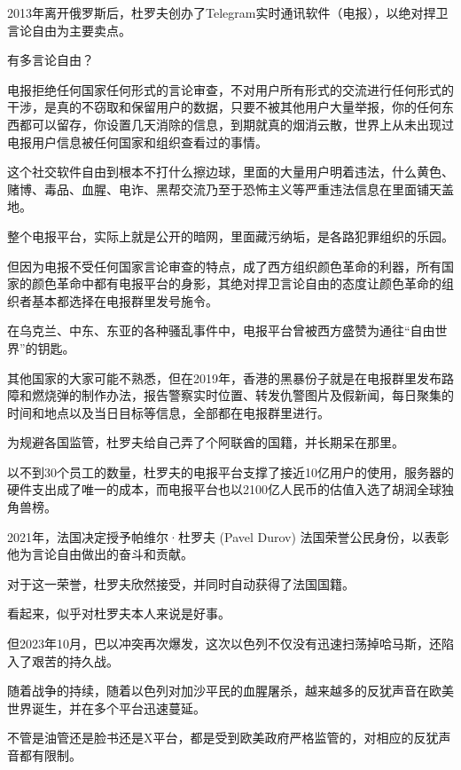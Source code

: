 \documentclass[UTF8,11pt,oneside]{ctexart}
\begin{document}

2013年离开俄罗斯后，杜罗夫创办了Telegram实时通讯软件（电报），以绝对捍卫言论自由为主要卖点。

有多言论自由？

电报拒绝任何国家任何形式的言论审查，不对用户所有形式的交流进行任何形式的干涉，是真的不窃取和保留用户的数据，只要不被其他用户大量举报，你的任何东西都可以留存，你设置几天消除的信息，到期就真的烟消云散，世界上从未出现过电报用户信息被任何国家和组织查看过的事情。

这个社交软件自由到根本不打什么擦边球，里面的大量用户明着违法，什么黄色、赌博、毒品、血腥、电诈、黑帮交流乃至于恐怖主义等严重违法信息在里面铺天盖地。


整个电报平台，实际上就是公开的暗网，里面藏污纳垢，是各路犯罪组织的乐园。

但因为电报不受任何国家言论审查的特点，成了西方组织颜色革命的利器，所有国家的颜色革命中都有电报平台的身影，其绝对捍卫言论自由的态度让颜色革命的组织者基本都选择在电报群里发号施令。

在乌克兰、中东、东亚的各种骚乱事件中，电报平台曾被西方盛赞为通往“自由世界”的钥匙。

其他国家的大家可能不熟悉，但在2019年，香港的黑暴份子就是在电报群里发布路障和燃烧弹的制作办法，报告警察实时位置、转发仇警图片及假新闻，每日聚集的时间和地点以及当日目标等信息，全部都在电报群里进行。

为规避各国监管，杜罗夫给自己弄了个阿联酋的国籍，并长期呆在那里。

以不到30个员工的数量，杜罗夫的电报平台支撑了接近10亿用户的使用，服务器的硬件支出成了唯一的成本，而电报平台也以2100亿人民币的估值入选了胡润全球独角兽榜。

2021年，法国决定授予帕维尔·杜罗夫 (Pavel Durov) 法国荣誉公民身份，以表彰他为言论自由做出的奋斗和贡献。

对于这一荣誉，杜罗夫欣然接受，并同时自动获得了法国国籍。

看起来，似乎对杜罗夫本人来说是好事。

但2023年10月，巴以冲突再次爆发，这次以色列不仅没有迅速扫荡掉哈马斯，还陷入了艰苦的持久战。

随着战争的持续，随着以色列对加沙平民的血腥屠杀，越来越多的反犹声音在欧美世界诞生，并在多个平台迅速蔓延。

不管是油管还是脸书还是X平台，都是受到欧美政府严格监管的，对相应的反犹声音都有限制。
\end{document}
